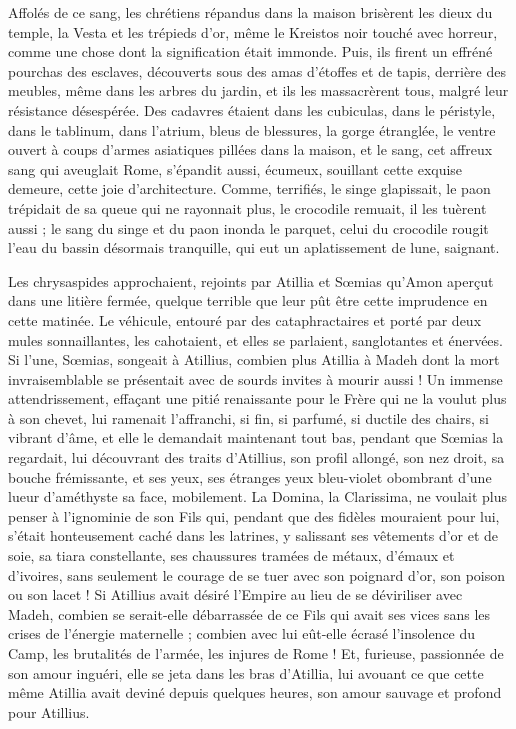 \documentclass[a4paper, 11pt, oneside, polutonikogreek, french]{article}
\begin{document}
Affolés de ce sang, les chrétiens répandus dans la maison brisèrent les dieux du temple, la Vesta et les trépieds d'or, même le Kreistos noir touché avec horreur, comme une chose dont la signification était immonde. Puis, ils firent un effréné pourchas des esclaves, découverts sous des amas d'étoffes et de tapis, derrière des meubles, même dans les arbres du jardin, et ils les massacrèrent tous, malgré leur résistance désespérée. Des cadavres étaient dans les cubiculas, dans le péristyle, dans le tablinum, dans l'atrium, bleus de blessures, la gorge étranglée, le ventre ouvert à coups d'armes asiatiques pillées dans la maison, et le sang, cet affreux sang qui aveuglait Rome, s'épandit aussi, écumeux, souillant cette exquise demeure, cette joie d'architecture. Comme, terrifiés, le singe glapissait, le paon trépidait de sa queue qui ne rayonnait plus, le crocodile remuait, il les tuèrent aussi ; le sang du singe et du paon inonda le parquet, celui du crocodile rougit l'eau du bassin désormais tranquille, qui eut un aplatissement de lune, saignant.

Les chrysaspides approchaient, rejoints par Atillia et Sœmias qu'Amon aperçut dans une litière fermée, quelque terrible que leur pût être cette imprudence en cette matinée. Le véhicule, entouré par des cataphractaires et porté par deux mules sonnaillantes, les cahotaient, et elles se parlaient, sanglotantes et énervées. Si l'une, Sœmias, songeait à Atillius, combien plus Atillia à Madeh dont la mort invraisemblable se présentait avec de sourds invites à mourir aussi ! Un immense attendrissement, effaçant une pitié renaissante pour le Frère qui ne la voulut plus à son chevet, lui ramenait l'affranchi, si fin, si parfumé, si ductile des chairs, si vibrant d'âme, et elle le demandait maintenant tout bas, pendant que Sœmias la regardait, lui découvrant des traits d'Atillius, son profil allongé, son nez droit, sa bouche frémissante, et ses yeux, ses étranges yeux bleu-violet obombrant d'une lueur d'améthyste sa face, mobilement. La Domina, la Clarissima, ne voulait plus penser à l'ignominie de son Fils qui, pendant que des fidèles mouraient pour lui, s'était honteusement caché dans les latrines, y salissant ses vêtements d'or et de soie, sa tiara constellante, ses chaussures tramées de métaux, d'émaux et d'ivoires, sans seulement le courage de se tuer avec son poignard d'or, son poison ou son lacet ! Si Atillius avait désiré l'Empire au lieu de se déviriliser avec Madeh, combien se serait-elle débarrassée de ce Fils qui avait ses vices sans les crises de l'énergie maternelle ; combien avec lui eût-elle écrasé l'insolence du Camp, les brutalités de l'armée, les injures de Rome ! Et, furieuse, passionnée de son amour inguéri, elle se jeta dans les bras d'Atillia, lui avouant ce que cette même Atillia avait deviné depuis quelques heures, son amour sauvage et profond pour Atillius.
\end{document}
